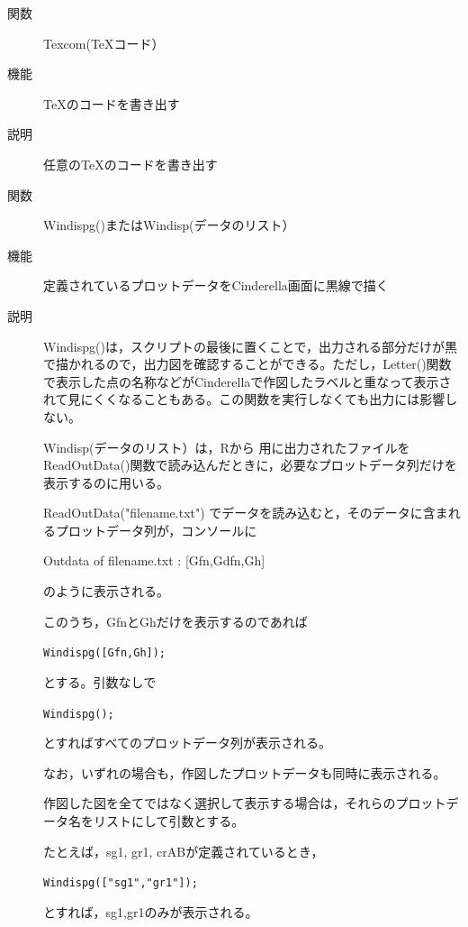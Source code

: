 \documentclass[papersize,a4paper,12pt,uplatex]{jsarticle}
\begin{document}
\begin{description}
\vspace{\baselineskip}
\hypertarget{texcom}{}
\item[関数]Texcom(\TeX コード）
\item[機能]\TeX のコードを書き出す
\item[説明]任意の\TeX のコードを書き出す

\vspace{\baselineskip}
\hypertarget{windispg}{}
\item[関数]Windispg()またはWindisp(データのリスト）
\item[機能]定義されているプロットデータをCinderella画面に黒線で描く
\item[説明]Windispg()は，スクリプトの最後に置くことで，出力される部分だけが黒で描かれるので，出力図を確認することができる。ただし，Letter()関数で表示した点の名称などがCinderellaで作図したラベルと重なって表示されて見にくくなることもある。この関数を実行しなくても出力には影響しない。

Windisp(データのリスト）は，Rから \ketcindy 用に出力されたファイルを ReadOutData()関数で読み込んだときに，必要なプロットデータ列だけを表示するのに用いる。

ReadOutData("filename.txt") でデータを読み込むと，そのデータに含まれるプロットデータ列が，コンソールに

\hspace{10mm}Outdata of filename.txt : [Gfn,Gdfn,Gh] 

のように表示される。

このうち，GfnとGhだけを表示するのであれば

\hspace{10mm}\verb|Windispg([Gfn,Gh]);|

とする。引数なしで
 
\hspace{10mm}\verb|Windispg();|

とすればすべてのプロットデータ列が表示される。

なお，いずれの場合も，作図したプロットデータも同時に表示される。

作図した図を全てではなく選択して表示する場合は，それらのプロットデータ名をリストにして引数とする。

たとえば，sg1, gr1, crABが定義されているとき，

\hspace{10mm}\verb|Windispg(["sg1","gr1"]);|

とすれば，sg1,gr1のみが表示される。



\end{description}
\end{document}
